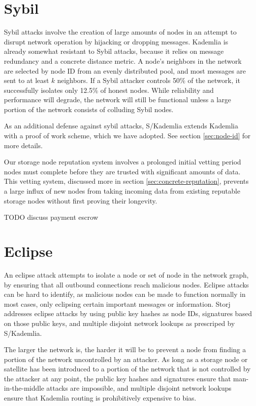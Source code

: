 \documentclass[11pt,fleqn,openany]{book}
\newcommand{\todo}[1]{{\color{red} TODO #1 }}
\begin{document}
\section{Sybil}

Sybil attacks involve the creation of large amounts of nodes in an attempt to
disrupt network operation by hijacking or dropping messages. Kademlia
\cite{kad} is already somewhat resistant to Sybil attacks, because
it relies on message redundancy and a concrete distance metric.
A node's neighbors in the network are selected by
node ID from an evenly distributed pool, and most messages are sent to at least
$k$ neighbors. If a Sybil attacker controls 50\% of the network, it
successfully isolates only 12.5\% of honest nodes. While reliability and
performance will degrade, the network will still be functional unless a large
portion of the network consists of colluding Sybil nodes.

As an additional defense against sybil attacks, S/Kademlia \cite{skad}
extends Kademlia with a proof of work scheme, which we have adopted. See section
\ref{sec:node-id} for more details.

Our storage node reputation system involves a prolonged initial vetting
period nodes must complete before they are trusted with significant amounts
of data. This vetting system, discussed more in section
\ref{sec:concrete-reputation}, prevents a large influx of new nodes from taking
incoming data from existing reputable storage nodes without first proving
their longevity.

\todo{discuss payment escrow}

\section{Eclipse}

An eclipse attack attempts to isolate a node or set of node in the network
graph, by ensuring that all outbound connections reach malicious nodes. Eclipse
attacks can be hard to identify, as malicious nodes can be made to function
normally in most cases, only eclipsing certain important messages or
information. Storj addresses eclipse attacks by using public key hashes as node
IDs, signatures based on those public keys, and multiple disjoint network
lookups as prescriped by S/Kademlia.

The larger the network is, the harder it will
be to prevent a node from finding a portion of the network uncontrolled by
an attacker.
As long as a storage node or satellite has been introduced to a portion of
the network that is not controlled by the attacker at any point, the public
key hashes and signatures ensure that man-in-the-middle attacks are impossible,
and multiple disjoint network lookups ensure that Kademlia routing is
prohibitively expensive to bias.
\end{document}
